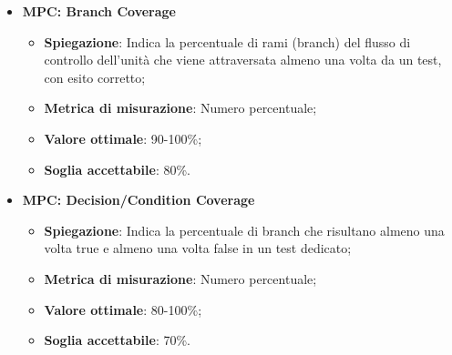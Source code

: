 \begin{itemize}
    \item \textbf{MPC: Branch Coverage}
    \begin{itemize}
        \item \textbf{Spiegazione}: Indica la percentuale di rami (branch) del flusso di controllo dell'unità che viene attraversata almeno una volta da un test, con esito corretto;
        \item \textbf{Metrica di misurazione}: Numero percentuale;
        \item \textbf{Valore ottimale}: 90-100\%;
        \item \textbf{Soglia accettabile}: 80\%.
    \end{itemize}
\end{itemize}

\begin{itemize}
    \item \textbf{MPC: Decision/Condition Coverage}
    \begin{itemize}
        \item \textbf{Spiegazione}: Indica la percentuale di branch che risultano almeno una volta true e almeno una volta false in un test dedicato;
        \item \textbf{Metrica di misurazione}: Numero percentuale;
        \item \textbf{Valore ottimale}: 80-100\%;
        \item \textbf{Soglia accettabile}: 70\%.
    \end{itemize}
\end{itemize}

